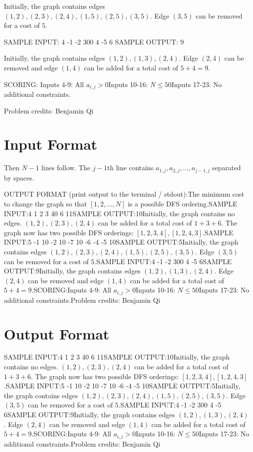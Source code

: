 \documentclass[12pt]{article}
\begin{document}
Initially, the graph contains edges $(1,2),(2,3),(2,4),(1,5),(2,5),(3,5)$. Edge
$(3,5)$ can be removed for a cost of $5$.

SAMPLE INPUT:
4
-1
-2 300
4 -5 6
SAMPLE OUTPUT: 
9

Initially, the graph contains edges $(1,2),(1,3),(2,4)$.  Edge $(2,4)$ can be
removed and edge $(1,4)$ can be added for a total cost of $5+4=9$.

SCORING:
Inputs 4-9: All $a_{i,j}>0$Inputs 10-16: $N\le 50$Inputs 17-23: No additional constraints.


Problem credits: Benjamin Qi



\section*{Input Format}
Then $N-1$ lines follow. The $j-1$th line contains
$a_{1,j}, a_{2,j}, \dots, a_{j-1,j}$ separated by spaces.

OUTPUT FORMAT (print output to the terminal / stdout):The minimum cost to change the graph so that $[1,2,\dots, N]$ is a possible DFS
ordering.SAMPLE INPUT:4
1
2 3
40 6 11SAMPLE OUTPUT:10Initially, the graph contains no edges. $(1,2),(2,3),(2,4)$ can be added for a
total cost of $1+3+6$. The graph now has two possible DFS orderings:
$[1,2,3,4],[1,2,4,3]$.SAMPLE INPUT:5
-1
10 -2
10 -7 10
-6 -4 -5 10SAMPLE OUTPUT:5Initially, the graph contains edges $(1,2),(2,3),(2,4),(1,5),(2,5),(3,5)$. Edge
$(3,5)$ can be removed for a cost of $5$.SAMPLE INPUT:4
-1
-2 300
4 -5 6SAMPLE OUTPUT:9Initially, the graph contains edges $(1,2),(1,3),(2,4)$.  Edge $(2,4)$ can be
removed and edge $(1,4)$ can be added for a total cost of $5+4=9$.SCORING:Inputs 4-9: All $a_{i,j}>0$Inputs 10-16: $N\le 50$Inputs 17-23: No additional constraints.Problem credits: Benjamin Qi

\section*{Output Format}
SAMPLE INPUT:4
1
2 3
40 6 11SAMPLE OUTPUT:10Initially, the graph contains no edges. $(1,2),(2,3),(2,4)$ can be added for a
total cost of $1+3+6$. The graph now has two possible DFS orderings:
$[1,2,3,4],[1,2,4,3]$.SAMPLE INPUT:5
-1
10 -2
10 -7 10
-6 -4 -5 10SAMPLE OUTPUT:5Initially, the graph contains edges $(1,2),(2,3),(2,4),(1,5),(2,5),(3,5)$. Edge
$(3,5)$ can be removed for a cost of $5$.SAMPLE INPUT:4
-1
-2 300
4 -5 6SAMPLE OUTPUT:9Initially, the graph contains edges $(1,2),(1,3),(2,4)$.  Edge $(2,4)$ can be
removed and edge $(1,4)$ can be added for a total cost of $5+4=9$.SCORING:Inputs 4-9: All $a_{i,j}>0$Inputs 10-16: $N\le 50$Inputs 17-23: No additional constraints.Problem credits: Benjamin Qi
\end{document}
